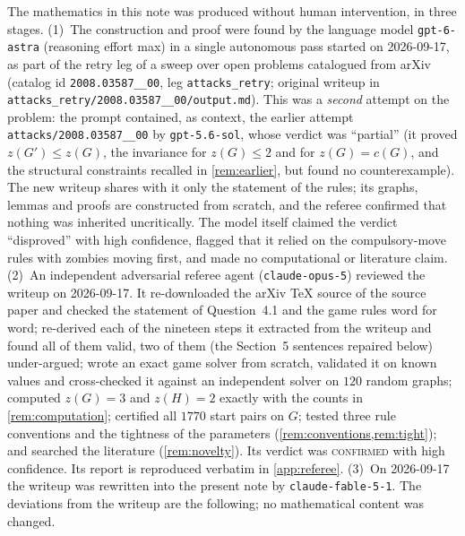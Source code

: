 \documentclass[11pt,a4paper]{article}
\theoremstyle{plain}
\theoremstyle{definition}
\theoremstyle{remark}
\begin{document}
The mathematics in this note was produced without human intervention, in three stages.
(1)~The construction and proof were found by the language model \texttt{gpt-6-astra} (reasoning effort max) in a single autonomous pass started on 2026-09-17, as part of the retry leg of a sweep over open problems catalogued from arXiv (catalog id \texttt{2008.03587\_\_00}, leg \texttt{attacks\_retry}; original writeup in \texttt{attacks\_retry/2008.03587\_\_00/output.md}). This was a \emph{second} attempt on the problem: the prompt contained, as context, the earlier attempt \texttt{attacks/2008.03587\_\_00} by \texttt{gpt-5.6-sol}, whose verdict was ``partial'' (it proved $z(G')\le z(G)$, the invariance for $z(G)\le2$ and for $z(G)=c(G)$, and the structural constraints recalled in \cref{rem:earlier}, but found no counterexample). The new writeup shares with it only the statement of the rules; its graphs, lemmas and proofs are constructed from scratch, and the referee confirmed that nothing was inherited uncritically. The model itself claimed the verdict ``disproved'' with high confidence, flagged that it relied on the compulsory-move rules with zombies moving first, and made no computational or literature claim.
(2)~An independent adversarial referee agent (\texttt{claude-opus-5}) reviewed the writeup on 2026-09-17. It re-downloaded the arXiv TeX source of the source paper and checked the statement of Question~4.1 and the game rules word for word; re-derived each of the nineteen steps it extracted from the writeup and found all of them valid, two of them (the Section~5 sentences repaired below) under-argued; wrote an exact game solver from scratch, validated it on known values and cross-checked it against an independent solver on $120$ random graphs; computed $z(G)=3$ and $z(H)=2$ exactly with the counts in \cref{rem:computation}; certified all $1770$ start pairs on $G$; tested three rule conventions and the tightness of the parameters (\cref{rem:conventions,rem:tight}); and searched the literature (\cref{rem:novelty}). Its verdict was \textsc{confirmed} with high confidence. Its report is reproduced verbatim in \cref{app:referee}.
(3)~On 2026-09-17 the writeup was rewritten into the present note by \texttt{claude-fable-5-1}. The deviations from the writeup are the following; no mathematical content was changed.
\end{document}
